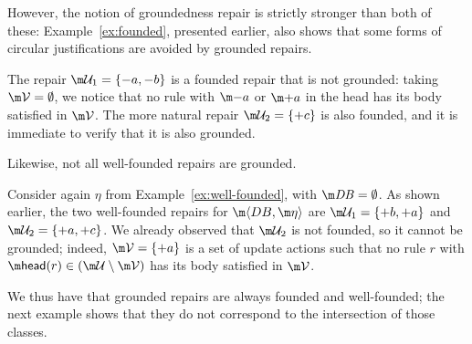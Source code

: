 However, the notion of groundedness repair is strictly stronger than both of these: Example~\ref{ex:founded}, presented earlier, also shows that some forms of circular justifications are avoided by grounded repairs.
\begin{example}
  \label{ex:founded-gr}
  The repair $\UU_1=\{-a,-b\}$ is a founded repair that is not grounded: taking
  $\VV=\emptyset$, we notice that no rule with $\remove a$ or $\add a$ in the head has its body satisfied in $\VV$. %
  The more natural repair $\UU_2=\{+c\}$ is also founded, and it is immediate to verify that it is also grounded.
\end{example}


Likewise, not all well-founded repairs are grounded. %
\begin{example}
  Consider again $\eta$ from Example~\ref{ex:well-founded}, with $\db=\emptyset$.
  As shown earlier, the two well-founded repairs for $\fulldb$ are $\UU_1=\{{+b},{+a}\}$ and $\UU_2=\{{+a},{+c}\}$.
  We already observed that $\UU_2$ is not founded, so it cannot be grounded; indeed,
  $\VV = \{{+a}\}$ is a set of update actions such that no rule $r$ with
  $\head(r)\in(\UU\setminus\VV)$
  has its body satisfied in $\VV$. %
\end{example}



We thus have that grounded repairs are always founded and well-founded; the next example shows that they do not correspond to the intersection of those classes.


